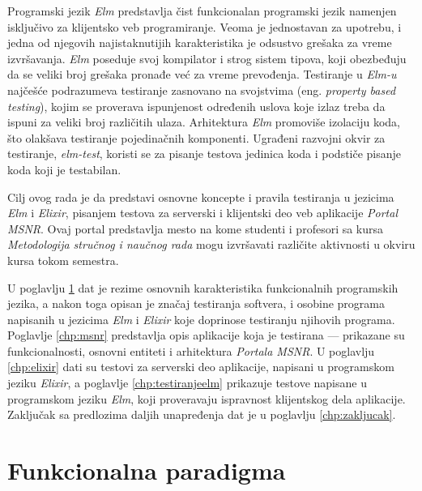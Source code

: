 \documentclass[12pt,oneside]{memoir}
\begin{document}
\par Programski jezik \emph{Elm} predstavlja čist funkcionalan programski jezik namenjen isključivo za klijentsko veb programiranje. Veoma je jednostavan za upotrebu, i jedna od njegovih najistaknutijih karakteristika je odsustvo grešaka za vreme izvršavanja. \emph{Elm} poseduje svoj kompilator i strog sistem tipova, koji obezbeđuju da se veliki broj grešaka pronađe već za vreme prevođenja. Testiranje u \emph{Elm-u} najčešće podrazumeva testiranje zasnovano na svojstvima (eng. \emph{property based testing}), kojim se proverava ispunjenost određenih uslova koje izlaz treba da ispuni za veliki broj različitih ulaza. Arhitektura \emph{Elm} promoviše izolaciju koda, što olakšava testiranje pojedinačnih komponenti. Ugrađeni razvojni okvir za testiranje, \emph{elm-test}, koristi se za pisanje testova jedinica koda i podstiče pisanje koda koji je testabilan.
\par Cilj ovog rada je da predstavi osnovne koncepte i pravila testiranja u jezicima \emph{Elm} i \emph{Elixir}, pisanjem testova za serverski i klijentski deo veb aplikacije \emph{Portal MSNR}. Ovaj portal predstavlja mesto na kome studenti i profesori sa kursa \emph{Metodologija stručnog i naučnog rada} mogu izvršavati različite aktivnosti u okviru kursa tokom semestra. 
\par U poglavlju \ref{chp:uvodnideo} dat je rezime osnovnih karakteristika funkcionalnih programskih jezika, a nakon toga opisan je značaj testiranja softvera, i osobine programa napisanih u jezicima \emph{Elm} i \emph{Elixir} koje doprinose testiranju njihovih programa. Poglavlje \ref{chp:msnr} predstavlja opis aplikacije koja je testirana --- prikazane su funkcionalnosti, osnovni entiteti i arhitektura \emph{Portala MSNR}. U poglavlju \ref{chp:elixir} dati su testovi za serverski deo aplikacije, napisani u programskom jeziku \emph{Elixir}, a poglavlje \ref{chp:testiranjeelm} prikazuje testove napisane u programskom jeziku \emph{Elm}, koji proveravaju ispravnost klijentskog dela aplikacije. Zaključak sa predlozima daljih unapređenja dat je u poglavlju \ref{chp:zakljucak}. 



\chapter{Funkcionalna paradigma}
\label{chp:uvodnideo}
\end{document}
